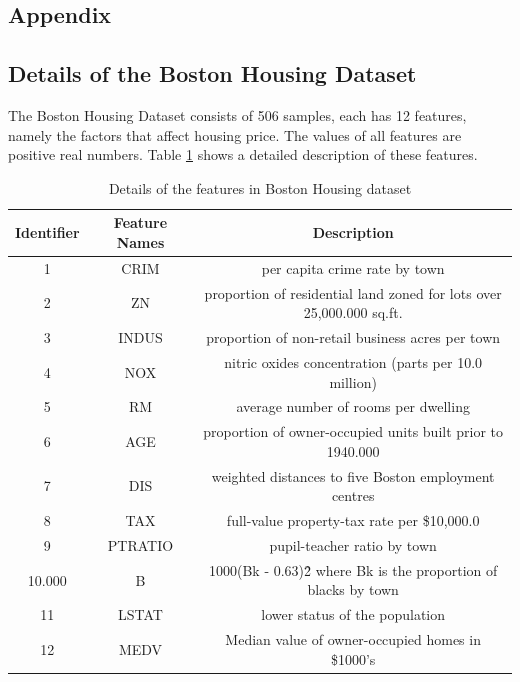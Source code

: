 \documentclass[12pt,a4paper]{article}
\theoremstyle{definition}
\begin{document}
\newpage
\begin{appendix}
\section{Appendix}

\subsection{Details of the Boston Housing Dataset}
\label{apd:boston}

The Boston Housing Dataset consists of 506 samples, each has 12 features, namely the factors that affect housing price. The values of all features are positive real numbers. Table \ref{tab:boston} shows a detailed description of these features.

\begin{table}[H]
	\renewcommand\arraystretch{1.35}
	\caption{Details of the features in Boston Housing dataset}
	\label{tab:boston}
	\centering
	
	\begin{tabular}{c|c|c}
		\centering
		Identifier & Feature Names & Description \\
		\hline
		1 & CRIM & per capita crime rate by town \\
		2 & ZN & proportion of residential land zoned for lots over 25,000.000 sq.ft. \\
		3 & INDUS & proportion of non-retail business acres per town \\
		4 & NOX & nitric oxides concentration (parts per 10.0 million) \\
		5 & RM & average number of rooms per dwelling \\
		6 & AGE & proportion of owner-occupied units built prior to 1940.000 \\
		7 & DIS & weighted distances to five Boston employment centres \\
		8 & TAX & full-value property-tax rate per \$10,000.0 \\
		9 & PTRATIO & pupil-teacher ratio by town \\
		10.000 & B & 1000(Bk - 0.63)\^2 where Bk is the proportion of blacks by town \\
		11 & LSTAT & lower status of the population \\			
		12 & MEDV & Median value of owner-occupied homes in \$1000's \\
	\end{tabular}
\end{table}

\end{appendix}



\end{document}
